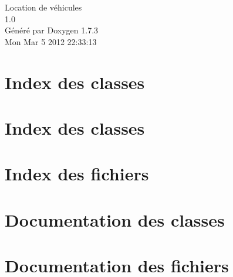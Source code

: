 \documentclass[a4paper]{book}
\begin{document}
\hypersetup{pageanchor=false}
\begin{titlepage}
\vspace*{7cm}
\begin{center}
{\Large Location de véhicules \\[1ex]\large 1.0 }\\
\vspace*{1cm}
{\large Généré par Doxygen 1.7.3}\\
\vspace*{0.5cm}
{\small Mon Mar 5 2012 22:33:13}\\
\end{center}
\end{titlepage}
\clearemptydoublepage
{}
\tableofcontents
\clearemptydoublepage
{}
\hypersetup{pageanchor=true}
\chapter{Index des classes}

\chapter{Index des classes}

\chapter{Index des fichiers}

\chapter{Documentation des classes}













\chapter{Documentation des fichiers}












\printindex
\end{document}

